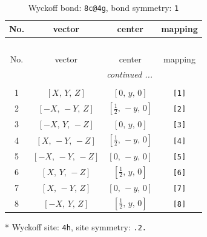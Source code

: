 \documentclass[fleqn,8pt]{jsarticle}
\begin{document}
\renewcommand{\arraystretch}{1.2}
\begin{longtable}{cccc}
\caption{Wyckoff bond: {\tt 8c@4g}, bond symmetry: {\tt 1}}
 \\
 \hline \hline
No. & vector & center & mapping \\ \hline \endfirsthead

\multicolumn{3}{l}{\tablename\ \thetable{}} \\
 \hline \hline
No. & vector & center & mapping \\ \hline \endhead

 \hline \hline
\multicolumn{3}{r}{\footnotesize\it continued ...} \\ \endfoot

 \hline \hline
\multicolumn{3}{r}{} \\ \endlastfoot

1 & $\left[ X,\, Y,\, Z \right]$ & $\left[ 0,\, y,\, 0 \right]$ & {\tt [1]} \\ \hline
2 & $\left[ - X,\, - Y,\, Z \right]$ & $\left[ \frac{1}{2},\, - y,\, 0 \right]$ & {\tt [2]} \\ \hline
3 & $\left[ - X,\, Y,\, - Z \right]$ & $\left[ 0,\, y,\, 0 \right]$ & {\tt [3]} \\ \hline
4 & $\left[ X,\, - Y,\, - Z \right]$ & $\left[ \frac{1}{2},\, - y,\, 0 \right]$ & {\tt [4]} \\ \hline
5 & $\left[ - X,\, - Y,\, - Z \right]$ & $\left[ 0,\, - y,\, 0 \right]$ & {\tt [5]} \\ \hline
6 & $\left[ X,\, Y,\, - Z \right]$ & $\left[ \frac{1}{2},\, y,\, 0 \right]$ & {\tt [6]} \\ \hline
7 & $\left[ X,\, - Y,\, Z \right]$ & $\left[ 0,\, - y,\, 0 \right]$ & {\tt [7]} \\ \hline
8 & $\left[ - X,\, Y,\, Z \right]$ & $\left[ \frac{1}{2},\, y,\, 0 \right]$ & {\tt [8]} \\
\end{longtable}
* Wyckoff site: {\tt 4h}, site symmetry: {\tt .2.}
\renewcommand{\arraystretch}{1.2}
\end{document}
